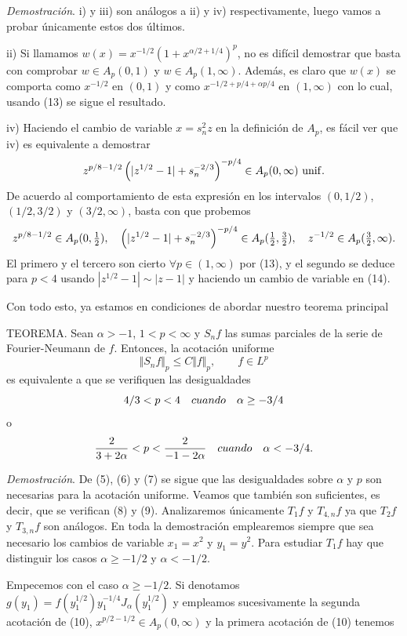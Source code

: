 {\it Demostraci\'on}. i) y iii) son an\'alogos a ii) y iv) respectivamente,
luego vamos a probar \'unicamente estos dos \'ultimos.

\noindent ii) Si llamamos $w(x) = x^{-1/2}\left( {1+x^{\alpha /2+1/4}}
\right)^p$, no es dif\'icil demostrar que basta con comprobar $w \in A_p(0,1)$ y
$w \in A_p(1,\infty)$. Adem\'as, es claro que $w(x)$ se comporta como $x^{-1/2}$
en $(0,1)$ y como $x^{-1/2+p/4+\alpha p/4}$ en $(1,\infty)$ con lo cual, usando
(13) se sigue el resultado.

\noindent iv) Haciendo el cambio de variable $x=s_n^2z$ en la definici\'on de
$A_p$, es f\'acil ver que iv) es equivalente a demostrar
$$z^{p/8-1/2}\left( {|z^{1/2}-1|+s_n^{-2/3}} \right)^{-p/4}\in
A_p(0,\infty ) {\rm\ unif.}$$
De acuerdo al comportamiento de esta expresi\'on en los intervalos $(0,1/2)$,
$(1/2,3/2)$ y $(3/2,\infty)$, basta con que probemos
$$z^{p/8-1/2}\in A_p(0,{\textstyle{1 \over 2}}),\quad \left(
{|z^{1/2}-1|+s_n^{-2/3}} \right)^{-p/4}\in A_p({\textstyle{1 \over
2}},{\textstyle{3 \over 2}}),\quad z^{-1/2}\in A_p({\textstyle{3 \over
2}},\infty).$$
El primero y el tercero son cierto $\forall p\in(1,\infty)$ por (13), y el
segundo se deduce para $p<4$ usando $|z^{1/2}-1|\sim|z-1|$ y haciendo un cambio
de variable en (14).

\bigskip

Con todo esto, ya estamos en condiciones de abordar nuestro teorema principal

\bigskip

\proclaim TEOREMA.
Sean $\alpha>-1$, $1<p<\infty$ y $S_nf$ las sumas parciales de la serie de
Fourier-Neumann de $f$. Entonces, la acotaci\'on uniforme
$$\Vert S_nf \Vert _p \le C \Vert f \Vert _p,\qquad f \in L^p$$
es equivalente a que se verifiquen las desigualdades
$$4/3 < p < 4\quad {\sl cuando }\quad \alpha \ge -3/4$$
o
$${2 \over {3+2\alpha}} < p < {2 \over {-1-2\alpha}}\quad 
{\sl cuando } \quad \alpha < -3/4.$$

{\it Demostraci\'on}. De (5), (6) y (7) se sigue que las desigualdades sobre
$\alpha$ y $p$ son necesarias para la acotaci\'on uniforme. Veamos que
tambi\'en son suficientes, es decir, que se verifican (8) y (9). Analizaremos
\'unicamente $T_1f$ y $T_{4,n}f$ ya que $T_2f$ y $T_{3,n}f$ son an\'alogos.
En toda la demostraci\'on emplearemos siempre que sea necesario los cambios de
variable $x_1=x^2$ y $y_1=y^2$.
Para estudiar $T_1f$ hay que distinguir los casos $\alpha \ge -1/2$ y $\alpha <
-1/2$.

\noindent Empecemos con el caso $\alpha \ge -1/2$. Si denotamos
$g(y_1)=f(y_1^{1/2})y_1^{-1/4}J_\alpha(y_1^{1/2})$ y empleamos sucesivamente la
segunda acotaci\'on de (10), $x^{p/2-1/2} \in A_p(0,\infty)$ y la primera
acotaci\'on de (10) tenemos

